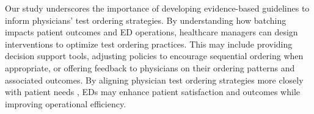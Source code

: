 \documentclass[,,nonblindrev]{informs}
\begin{document}
Our study underscores the importance of developing evidence-based
guidelines to inform physicians' test ordering strategies. By
understanding how batching impacts patient outcomes and ED operations,
healthcare managers can design interventions to optimize test ordering
practices. This may include providing decision support tools, adjusting
policies to encourage sequential ordering when appropriate, or offering
feedback to physicians on their ordering patterns and associated
outcomes. By aligning physician test ordering strategies more closely
with patient needs \citep{Atkinson2023}, EDs may enhance patient
satisfaction and outcomes while improving operational efficiency.

\clearpage

%
%
%


\ACKNOWLEDGMENT{}



\end{document}
